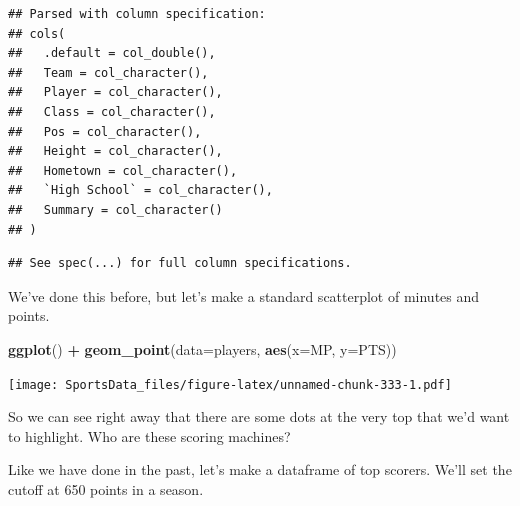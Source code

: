 \documentclass[]{book}
\newenvironment{Shaded}{\begin{snugshade}}{\end{snugshade}}
\newcommand{\DataTypeTok}[1]{\textcolor[rgb]{0.13,0.29,0.53}{#1}}
\newcommand{\DecValTok}[1]{\textcolor[rgb]{0.00,0.00,0.81}{#1}}
\newcommand{\KeywordTok}[1]{\textcolor[rgb]{0.13,0.29,0.53}{\textbf{#1}}}
\newcommand{\NormalTok}[1]{#1}
\newcommand{\OperatorTok}[1]{\textcolor[rgb]{0.81,0.36,0.00}{\textbf{#1}}}
\newcommand{\StringTok}[1]{\textcolor[rgb]{0.31,0.60,0.02}{#1}}
\begin{document}
\begin{Shaded}
\end{Shaded}

\begin{verbatim}
## Parsed with column specification:
## cols(
##   .default = col_double(),
##   Team = col_character(),
##   Player = col_character(),
##   Class = col_character(),
##   Pos = col_character(),
##   Height = col_character(),
##   Hometown = col_character(),
##   `High School` = col_character(),
##   Summary = col_character()
## )
\end{verbatim}

\begin{verbatim}
## See spec(...) for full column specifications.
\end{verbatim}

We've done this before, but let's make a standard scatterplot of minutes and points.

\begin{Shaded}
\begin{Highlighting}[]
\KeywordTok{ggplot}\NormalTok{() }\OperatorTok{+}\StringTok{ }\KeywordTok{geom_point}\NormalTok{(}\DataTypeTok{data=}\NormalTok{players, }\KeywordTok{aes}\NormalTok{(}\DataTypeTok{x=}\NormalTok{MP, }\DataTypeTok{y=}\NormalTok{PTS))}
\end{Highlighting}
\end{Shaded}

\texttt{[image: SportsData\_files/figure-latex/unnamed-chunk-333-1.pdf]}

So we can see right away that there are some dots at the very top that we'd want to highlight. Who are these scoring machines?

Like we have done in the past, let's make a dataframe of top scorers. We'll set the cutoff at 650 points in a season.

\begin{Shaded}
\end{Shaded}
\end{document}
